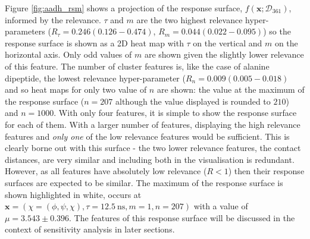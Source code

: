 Figure \ref{fig:aadh_rsm} shows  a projection of the response surface, $f(\mathbf{x};\mathcal{D}_{361})$, informed by the relevance. $\tau$ and $m$ are the two highest relevance hyper-parameters ($R_{\tau} = 0.246 (0.126-0.474)$, $R_{m} = 0.044 (0.022-0.095)$) so the response surface is shown as a 2D heat map with $\tau$ on the vertical and $m$ on the horizontal axis. Only odd values of $m$ are shown given the slightly lower relevance of this feature. The number of cluster features is, like the case of alanine dipeptide, the lowest relevance hyper-parameter ($R_{n} = 0.009 (0.005-0.018)$ and so heat maps for only two value of $n$ are shown: the value at the maximum of the response surface ($n=207$ although the value displayed is rounded to $210$) and $n=1000$. With only four features, it is  simple to show the response surface for each of them. With a larger number of features, displaying the high relevance features and \emph{only one} of the low relevance features would be sufficient. This is clearly borne out with this surface - the two lower relevance features, the contact distances, are very similar and including both in the visualisation is redundant. However, as all features have absolutely low relevance ($R<1$) then their response surfaces are expected to be similar. The maximum of the response surface is shown highlighted in white, occurs at $\mathbf{x}=\left(\chi=(\phi, \psi, \chi), \tau = \SI{12.5}{\nano\second}, m=1, n=207\right)$ with a value of $\mu=3.54 3\pm 0.396$. The features of this response surface will be discussed in the context of sensitivity analysis in later sections. 

